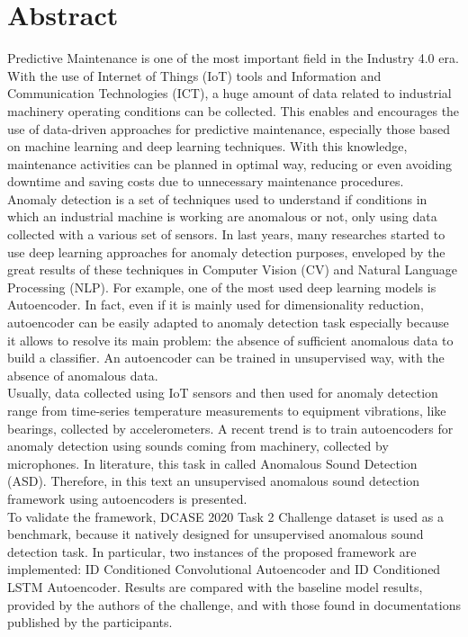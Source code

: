 \chapter{Abstract} 

Predictive Maintenance is one of the most important field in the Industry 4.0 era. With the use of Internet of Things (IoT) tools and Information and Communication Technologies (ICT), a huge amount of data related to industrial machinery operating conditions can be collected. This enables and encourages the use of data-driven approaches for predictive maintenance, especially those based on machine learning and deep learning techniques. With this knowledge, maintenance activities can be planned in optimal way, reducing or even avoiding downtime and saving costs due to unnecessary maintenance procedures.\\
Anomaly detection is a set of techniques used to understand if conditions in which an industrial machine is working are anomalous or not, only using data collected with a various set of sensors. In last years, many researches started to use deep learning approaches for anomaly detection purposes, enveloped by the great results of these techniques in Computer Vision (CV) and Natural Language Processing (NLP). For example, one of the most used deep learning models is Autoencoder. In fact, even if it is mainly used for dimensionality reduction, autoencoder can be easily adapted to anomaly detection task especially because it allows to resolve its main problem: the absence of sufficient anomalous data to build a classifier. An autoencoder can be trained in unsupervised way, with the absence of anomalous data.\\ Usually, data collected using IoT sensors and then used for anomaly detection range from time-series temperature measurements to equipment vibrations, like bearings, collected by accelerometers. A recent trend is to train autoencoders for anomaly detection using sounds coming from machinery, collected by microphones. In literature, this task in called Anomalous Sound Detection (ASD). Therefore, in this text an unsupervised anomalous sound detection framework using autoencoders is presented.\\
To validate the framework, DCASE 2020 Task 2 Challenge dataset is used as a benchmark, because it natively designed for unsupervised anomalous sound detection task. In particular, two instances of the proposed framework are implemented: ID Conditioned Convolutional Autoencoder and ID Conditioned LSTM Autoencoder. Results are compared with the baseline model results, provided by the authors of the challenge, and with those found in documentations published by the participants.